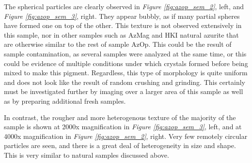 The spherical particles are clearly observed in \textit{Figure \ref{fig:azop_sem_2}}, left, and \textit{Figure \ref{fig:azop_sem_3}}, right. They appear bubbly, as if many partial spheres have formed one on top of the other. This texture is not observed extensively in this sample, nor in other samples such as AzMag and HKI natural azurite that are otherwise similar to the rest of sample AzOp. This could be the result of sample contamination, as several samples were analyzed at the same time, or this could be evidence of multiple conditions under which crystals formed before being mixed to make this pigment. Regardless, this type of morphology is quite uniform and does not look like the result of random crushing and grinding. This certainly must be investigated further by imaging over a larger area of this sample as well as by preparing additional fresh samples.

In contrast, the rougher and more heterogenous texture of the majority of the sample is shown at 2000x magnification in \textit{Figure \ref{fig:azop_sem_3}}, left, and at 4000x magnification in \textit{Figure \ref{fig:azop_sem_2}}, right. Very few remotely circular particles are seen, and there is a great deal of heterogeneity in size and shape. This is very similar to natural samples discussed above.


